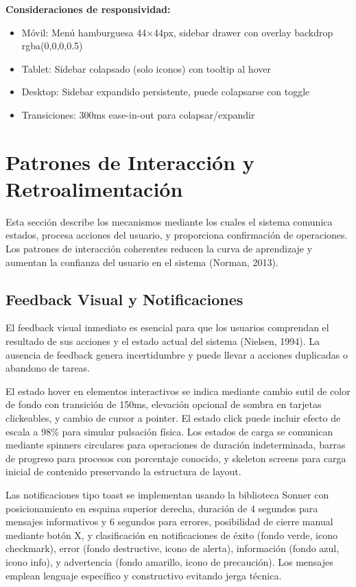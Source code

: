 \documentclass[12pt,a4paper,oneside]{article}
\begin{document}
\textbf{Consideraciones de responsividad:}
\begin{itemize}
    \item Móvil: Menú hamburguesa 44×44px, sidebar drawer con overlay backdrop rgba(0,0,0,0.5)
    \item Tablet: Sidebar colapsado (solo iconos) con tooltip al hover
    \item Desktop: Sidebar expandido persistente, puede colapsarse con toggle
    \item Transiciones: 300ms ease-in-out para colapsar/expandir
\end{itemize}

\section{Patrones de Interacción y Retroalimentación}

Esta sección describe los mecanismos mediante los cuales el sistema comunica estados, procesa acciones del usuario, y proporciona confirmación de operaciones. Los patrones de interacción coherentes reducen la curva de aprendizaje y aumentan la confianza del usuario en el sistema (Norman, 2013).

\subsection{Feedback Visual y Notificaciones}

El feedback visual inmediato es esencial para que los usuarios comprendan el resultado de sus acciones y el estado actual del sistema (Nielsen, 1994). La ausencia de feedback genera incertidumbre y puede llevar a acciones duplicadas o abandono de tareas.

El estado hover en elementos interactivos se indica mediante cambio sutil de color de fondo con transición de 150ms, elevación opcional de sombra en tarjetas clickeables, y cambio de cursor a pointer. El estado click puede incluir efecto de escala a 98\% para simular pulsación física. Los estados de carga se comunican mediante spinners circulares para operaciones de duración indeterminada, barras de progreso para procesos con porcentaje conocido, y skeleton screens para carga inicial de contenido preservando la estructura de layout.

Las notificaciones tipo toast se implementan usando la biblioteca Sonner con posicionamiento en esquina superior derecha, duración de 4 segundos para mensajes informativos y 6 segundos para errores, posibilidad de cierre manual mediante botón X, y clasificación en notificaciones de éxito (fondo verde, icono checkmark), error (fondo destructive, icono de alerta), información (fondo azul, icono info), y advertencia (fondo amarillo, icono de precaución). Los mensajes emplean lenguaje específico y constructivo evitando jerga técnica.
\end{document}
